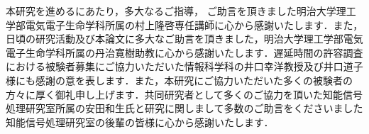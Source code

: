 \begin{acknowledgement}
本研究を進めるにあたり，多大なるご指導，
ご助言を頂きました明治大学理工学部電気電子生命学科所属の村上隆啓専任講師に心から感謝いたします．また，日頃の研究活動及び本論文に多大なご助言を頂きました，明治大学理工学部電気電子生命学科所属の丹治寛樹助教に心から感謝いたします．遅延時間の許容調査における被験者募集にご協力いただいた情報科学科の井口幸洋教授及び井口道子様にも感謝の意を表します．また，本研究にご協力いただいた多くの被験者の方々に厚く御礼申し上げます．共同研究者として多くのご協力を頂いた知能信号処理研究室所属の安田和生氏と研究に関しまして多数のご助言をくださいました知能信号処理研究室の後輩の皆様に心から感謝いたします．
\makesignature
\end{acknowledgement}
